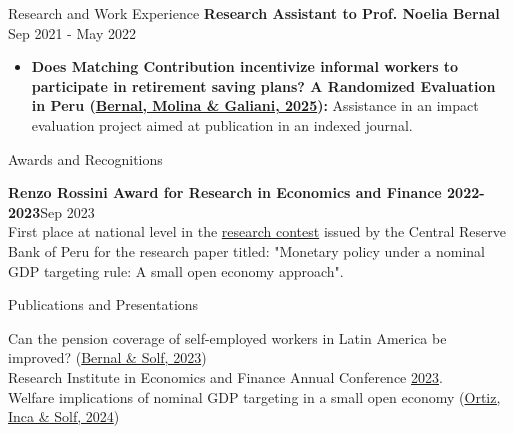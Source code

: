 \documentclass{resume} %
\begin{document}
\begin{rSection}{Research and Work Experience}
{\bf Research Assistant to Prof. Noelia Bernal} \hfill {Sep 2021 - May 2022}
\begin{itemize}
\setlength\itemsep{-0.5em}
    \item {\bf Does Matching Contribution incentivize informal workers to participate in retirement saving plans? A Randomized Evaluation in Peru (\href{https://doi.org/10.3386/w33925}{Bernal, Molina \& Galiani, 2025}):} Assistance in an impact evaluation project aimed at publication in an indexed journal. %
\end{itemize} 
\end{rSection}

\begin{rSection}{Awards and Recognitions}

{\bf Renzo Rossini Award for Research in Economics and Finance 2022-2023}\hfill {Sep 2023}
\\
First place at national level in the \href{https://www.bcrp.gob.pe/docs/Proyeccion-Institucional/premio-renzo-rossini/premio-renzo-rossini-2022-2023-resultados.pdf}{research contest} issued by the Central Reserve Bank of Peru for the research paper titled: "Monetary policy under a nominal GDP targeting rule: A small open economy approach".
\end{rSection}

\begin{rSection}{Publications and Presentations}

Can the pension coverage of self-employed workers in Latin America be improved? (\href{https://www.pinboxsolutions.com/resources/books/book-latin-america/}{Bernal \& Solf, 2023})
\\
Research Institute in Economics and Finance Annual Conference \href{https://ri-ef.com/rief-annual-conference-2023/}{2023}.
\\
Welfare implications of nominal GDP targeting in a small open economy (\href{https://mpra.ub.uni-muenchen.de/119999/}{Ortiz, Inca \& Solf, 2024})

\end{rSection}
\end{document}
